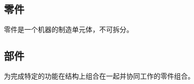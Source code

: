 \subsection{零件}
\begin{definition}[零件]
    零件是一个机器的制造单元体，不可拆分。
\end{definition}

\subsection{部件}
\begin{definition}[部件]
    为完成特定的功能在结构上组合在一起并协同工作的零件组合。
\end{definition}